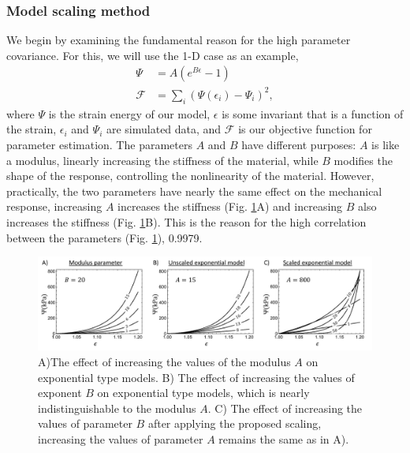 \subsubsection{Model scaling method}

	We begin by examining the fundamental reason for the high parameter covariance. For this, we will use the 1-D case as an example,
\begin{equation}
\begin{aligned}
\Psi &= A \left(e^{B \epsilon} - 1\right) \\
\mathcal{F} &= \sum_i \left(\Psi(\epsilon_i) - \Psi_i \right)^2,
\end{aligned}
\end{equation}
where $\Psi$ is the strain energy of our model, $\epsilon$ is some invariant that is a function of the strain, $\epsilon_i$ and $\Psi_i$ are simulated data, and $\mathcal{F}$ is our objective function for parameter estimation. The parameters $A$ and $B$ have different purposes: $A$ is like a modulus, linearly increasing the stiffness of the material, while $B$ modifies the shape of the response, controlling the nonlinearity of the material. However, practically, the two parameters have nearly the same effect on the mechanical response, increasing $A$ increases the stiffness (Fig. \ref{fig:scalingapproach}A) and increasing $B$ also increases the stiffness (Fig. \ref{fig:scalingapproach}B). This is the reason for the high correlation between the parameters (Fig. \ref{fig:scalingapproach}), 0.9979.


\begin{figure}
\centering
\includegraphics[width=\textwidth]{Images/chapter5/scalingapproach}
\caption{A)The effect of increasing the values of the modulus $A$ on exponential type models. B) The effect of increasing the values of exponent $B$ on exponential type models, which is nearly indistinguishable to the modulus $A$. C) The effect of increasing the values of parameter $B$ after applying the proposed scaling, increasing the values of parameter $A$ remains the same as in A).}
\label{fig:scalingapproach}
\end{figure}


